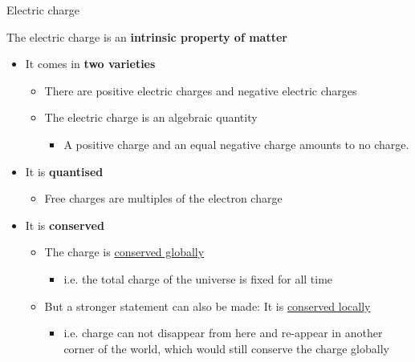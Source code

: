 
%
%
%

\begin{frame}{Electric charge}

\begin{center}
    The electric charge is an {\bf intrinsic property of matter}
\end{center}

\begin{itemize}
  \item It comes in {\bf two varieties}
    \begin{itemize}
      \item There are positive electric charges and negative electric charges
      \item The electric charge is an algebraic quantity
        \begin{itemize}
           \item A positive charge and an equal negative charge amounts to no charge.
        \end{itemize}
    \end{itemize}
  \item It is {\bf quantised}
    \begin{itemize}
      \item Free charges are multiples of the electron charge
    \end{itemize}
  \item It is {\bf conserved}
    \begin{itemize}
      \item The charge is \underline{conserved globally}
        \begin{itemize}
           \item i.e. the total charge of the universe is fixed for all time
        \end{itemize}
      \item But a stronger statement can also be made: It is \underline{conserved locally}
        \begin{itemize}
            \item i.e. charge can not disappear from here and re-appear in another corner of the world,
                  which would still conserve the charge globally
        \end{itemize}
    \end{itemize}
\end{itemize}

\end{frame}


